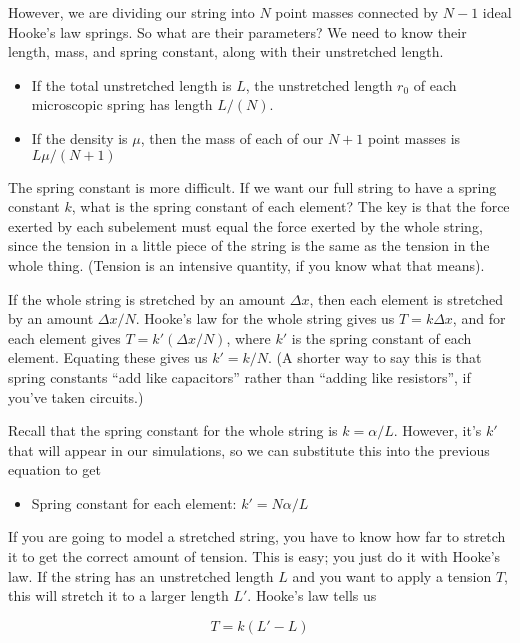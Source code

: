 \documentclass[12ampt]{article}
\begin{document}
However, we are dividing our string into
$N$ point masses connected by $N-1$ ideal Hooke’s law springs. So what are their
parameters? We need to know their length, mass, and spring constant, along with their unstretched length.

\begin{itemize}
  \item{If the total unstretched length is $L$, the unstretched length $r_0$ of each microscopic spring has length $L/(N)$.}
  \item{If the density is $\mu$, then the mass of each of our $N+1$ point masses is $L \mu / (N+1)$}
     \end{itemize}


     The spring constant is more difficult. If we want our full string to have a spring constant
     $k$, what is the spring constant of each element? The key is that the force exerted by each
     subelement must equal the force exerted by the whole string, since the tension in a little
     piece of the string is the same as the tension in the whole thing. (Tension is an intensive
     quantity, if you know what that means).

     If the whole string is stretched by an amount $\Delta x$, then each element
     is stretched by an amount $\Delta x/N$. Hooke's law for the whole string
     gives us $T=k\Delta x$, and for each element gives $T=k'(\Delta x/N)$, 
     where $k'$ is the spring constant of each element. Equating these gives us
     $k'=k/N$. (A shorter way to say this is that spring constants ``add like capacitors” rather
     than ``adding like resistors”, if you’ve taken circuits.)

     Recall that the spring constant for the whole string is $k=\alpha/L$. 
     However, it's $k'$ that will appear in our simulations, so we can 
     substitute this into the previous equation to get

     \begin{itemize}
       \item{Spring constant for each element: $k'=N\alpha/L$}
     \end{itemize}

     If you are going to model a stretched string, you have to know how far to stretch it to get the correct amount of tension. This is easy; you just do it with Hooke’s law.
If the string has an unstretched length $L$ and you want to apply a tension $T$,
this will stretch it to a larger length $L'$. Hooke's law tells us

\begin{equation}
  T = k(L'-L)
\end{equation}
\end{document}
